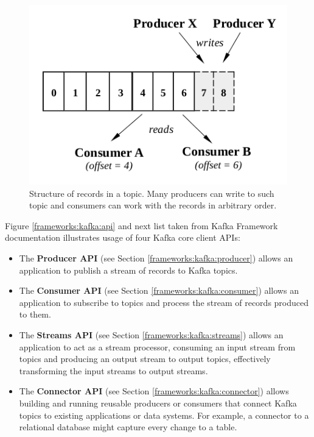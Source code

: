 \begin{figure}[h]
  \center
  \includegraphics{img/kafka-topic-structure.png}
  \caption{Structure of records in a topic. Many producers can write to such topic and consumers can work with the records in arbitrary order.}
  \label{frameworks:kafka:topic}
\end{figure}

Figure \ref{frameworks:kafka:api} and next list taken from Kafka Framework documentation \citep{Kafka}
illustrates usage of four Kafka core client APIs:
\begin{itemize}
  \item The \textbf{Producer API} (see Section \ref{frameworks:kafka:producer}) allows an application to publish
    a stream of records to Kafka topics.
  \item The \textbf{Consumer API} (see Section \ref{frameworks:kafka:consumer}) allows an application to subscribe
    to topics and process the stream of records produced to them.
  \item The \textbf{Streams API} (see Section \ref{frameworks:kafka:streams}) allows an application to act as a stream processor,
    consuming an input stream from topics and producing an output stream to output topics,
    effectively transforming the input streams to output streams.
  \item The \textbf{Connector API} (see Section \ref{frameworks:kafka:connector}) allows building and running\break
    reusable producers or consumers
    that connect Kafka topics to existing applications or data systems.
    For example, a connector to a relational database might capture every change to a table. 
\end{itemize}

